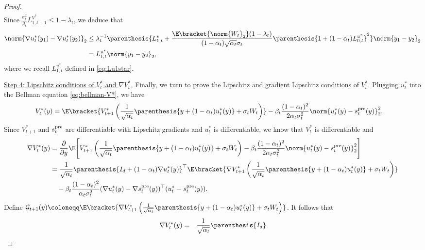 \documentclass{article}
\begin{document}
\begin{proof}
\begin{align*}
\end{align*}
Since $ \frac{\sigma_{t}^{2}}{\beta_{t}}L_{1, t+1}^{V^{*}} \leq 1 - \lambda_{t} $, we deduce that
\begin{align*}
    \norm{\nabla u_{t}^{*}(y_{1}) - \nabla u_{t}^{*}(y_{2})}_2 & \leq \lambda_{t}^{-1}\parenthesis{L_{1, t}^{s} +  \frac{\E\bracket{\norm{W_{t}}_2}(1 - \lambda_t)}{(1 - \alpha_t)\sqrt{\alpha_{t}}\sigma_{t}}\parenthesis{1 + (1 - \alpha_{t})L_{0,t}^{u^{*}}}^{2}}\norm{y_1 - y_2}_2 \\ &  = L_{1, t}^{u^*}\norm{y_1 - y_2}_2,
\end{align*}
where we recall $L_{1, t}^{u^*}$ defined in \eqref{eq:Lu1star}.


\underline{Step 4: Lipschitz conditions of $ V_{t}^{*} $ and $ \nabla V_{t}^{*}$.} Finally, we turn to prove the Lipschitz and gradient Lipschitz conditions of $V_t^*$. Plugging $u_t^*$ into the Bellman equation \eqref{eq:bellman-V*}, we have
\begin{align}\label{eq:bellman-u*}
 V_t^*(y) & = \E\bracket{V^{*}_{t+1}\left(\frac{1}{\sqrt{\alpha_t}}\parenthesis{y + (1 - \alpha_t)u_t^*(y)} + \sigma_t W_t\right)} - \beta_t \frac{(1 - \alpha_{t})^{2}}{2\alpha_{t}\sigma_{t}^{2}}\norm{u_t^*(y) - s^{\rm pre}_{t}(y)}_{2}^{2}.
\end{align}
Since $V_{t+1}^*$ and $s_t^{\rm pre}$ are differentiable with Lipschitz gradients and $u_t^*$ is differentiable, we know that $V_{t}^{*}$ is differentiable and 
\begin{align*}
 \nabla V_t^*(y) &= \frac{\partial}{\partial y} \E\Bigg[V^{*}_{t+1}\left(\frac{1}{\sqrt{\alpha_t}}\parenthesis{y + (1 - \alpha_t)u_t^*(y)} + \sigma_t W_t\right)- \beta_t \frac{(1 - \alpha_{t})^{2}}{2\alpha_{t}\sigma_{t}^{2}}\norm{u_t^*(y) - s^{\rm pre}_{t}(y)}_{2}^{2}\Bigg]  \\
 &= \frac{1}{\sqrt{\alpha_t}}\parenthesis{I_d 
 + (1 - \alpha_t) \nabla u_t^*(y)}^\top\E\bracket{\nabla V_{t+1}^{*}\left(\frac{1}{\sqrt{\alpha_t}}\parenthesis{y + (1 - \alpha_t)u_t^*(y)} + \sigma_t W_t\right)}\\
 & \quad - \beta_t \frac{(1 - \alpha_{t})^{2}}{\alpha_{t}\sigma_{t}^{2}}(\nabla u_t^*(y) - \nabla s^{\rm pre}_{t}(y))^\top(u_t^* - s^{\rm pre}_{t}(y)).
\end{align*}
Define $\mathcal{G}_{t+1}(y) \coloneqq \E\bracket{\nabla V_{t+1}^{*}\left(\frac{1}{\sqrt{\alpha_t}}\parenthesis{y + (1 - \alpha_t)u_t^*(y)} + \sigma_t W_t\right)} $. It follows that 
\begin{eqnarray} 
 \nabla V_t^*(y) 
 &=&\frac{1}{\sqrt{\alpha_t}}\parenthesis{I_d 
}
\end{eqnarray}
\end{proof}
\end{document}
